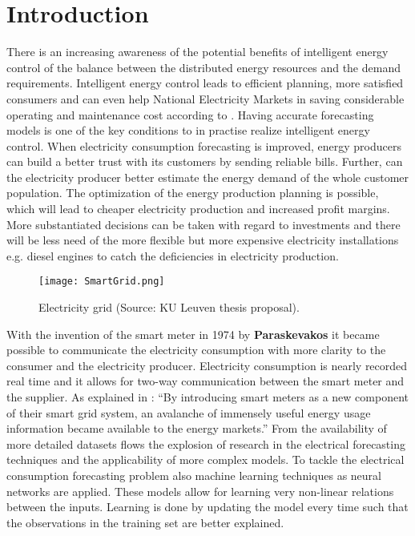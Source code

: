 \chapter{Introduction}

There is an increasing awareness of the potential benefits of intelligent energy control of the balance between the distributed energy resources and the demand requirements. Intelligent energy control leads to efficient planning, more satisfied consumers and can even help National Electricity Markets in saving considerable operating and maintenance cost according to \cite{NarjesFallah2018}. Having accurate forecasting models is one of the key conditions to in practise realize intelligent energy control. When electricity consumption forecasting is improved, energy producers can build a better trust with its customers by sending reliable bills. Further, can the electricity producer better estimate the energy demand of the whole customer population. The optimization of the energy production planning is possible, which will lead to cheaper electricity production and increased profit margins. More substantiated decisions can be taken with regard to investments and there will be less need of the more flexible but more expensive electricity installations e.g. diesel engines to catch the deficiencies in electricity production.\\

\begin{figure}[h!]
	\centering
	\texttt{[image: SmartGrid.png]}
	\caption{Electricity grid (Source: KU Leuven thesis proposal).}
	\label{fig:power_image}
\end{figure}

With the invention of the smart meter in 1974 by \textbf{Paraskevakos} it became possible to communicate the electricity consumption with more clarity to the consumer and the electricity producer. Electricity consumption is nearly recorded real time and it allows for two-way communication between the smart meter and the supplier. As explained in \cite{Depuru2011}: ``By introducing smart meters as a new
component of their smart grid system, an avalanche of immensely useful energy usage information
became available to the energy markets.'' From the availability of more detailed datasets flows the explosion of research in the electrical forecasting techniques and the applicability of more complex models. To tackle the electrical consumption forecasting problem also machine learning techniques as neural networks are applied. These models allow for learning very non-linear relations between the inputs. Learning is done by updating the model every time such that the observations in the training set are better explained.\\


